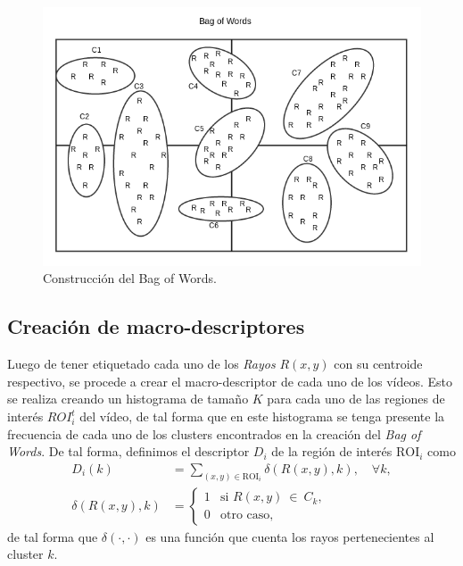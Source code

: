 	\begin{figure}[tb]
		\centering
    		\includegraphics[width=1\textwidth]{Figuras/Diagramas/bow_solo.png}
  		\caption{Construcción del Bag of Words.}
  		\label{algoritmo:fig:bow}
	\end{figure}	

	\subsection{Creación de macro-descriptores}
	\label{algoritmo:crea_macro-descriptores}
	Luego de tener etiquetado cada uno de los \textit{Rayos} $R(x,y)$ con su centroide respectivo, se procede a crear el macro-descriptor de cada uno de los vídeos.	 Esto se realiza creando un histograma de tamaño $K$ para cada uno de las regiones de interés ${ROI}_{i}^{t}$ del vídeo, de tal forma que en este histograma se tenga presente la frecuencia de cada uno de los clusters encontrados en la creación del \textit{Bag of Words}. De tal forma, definimos el descriptor $D_i$ de la región de interés $\text{ROI}_i$ como
	\begin{align}
		\label{algoritmo:eq:hist}
		D_i(k) &= \sum_{(x,y)\in \text{ROI}_i} \delta (R(x,y),k), \quad \forall k,\\
		\label{algoritmo:eq:fun_hist}
		 \delta (R(x,y),k) &= \begin{cases}
		 1 & \mbox{si }R(x,y)~\in~C_k,\\
     0 & \text{otro caso},
     \end{cases}
	\end{align}
de tal forma que $\delta(\cdot,\cdot)$ es una función que cuenta los rayos pertenecientes al cluster $k$.

